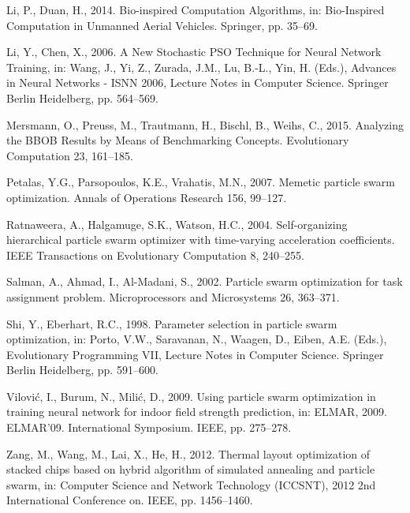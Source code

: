 \documentclass[12pt]{article}
\begin{document}
\begin{thebibliography}{20}
Li, P., Duan, H., 2014. Bio-inspired Computation Algorithms, in: Bio-Inspired Computation in Unmanned Aerial Vehicles. Springer, pp. 35–69.

Li, Y., Chen, X., 2006. A New Stochastic PSO Technique for Neural Network Training, in: Wang, J., Yi, Z., Zurada, J.M., Lu, B.-L., Yin, H. (Eds.), Advances in Neural Networks - ISNN 2006, Lecture Notes in Computer Science. Springer Berlin Heidelberg, pp. 564–569.

Mersmann, O., Preuss, M., Trautmann, H., Bischl, B., Weihs, C., 2015. Analyzing the BBOB Results by Means of Benchmarking Concepts. Evolutionary Computation 23, 161–185. %

Petalas, Y.G., Parsopoulos, K.E., Vrahatis, M.N., 2007. Memetic particle swarm optimization. Annals of Operations Research 156, 99–127. %

Ratnaweera, A., Halgamuge, S.K., Watson, H.C., 2004. Self-organizing hierarchical particle swarm optimizer with time-varying acceleration coefficients. IEEE Transactions on Evolutionary Computation 8, 240–255. %

Salman, A., Ahmad, I., Al-Madani, S., 2002. Particle swarm optimization for task assignment problem. Microprocessors and Microsystems 26, 363–371. %

Shi, Y., Eberhart, R.C., 1998. Parameter selection in particle swarm optimization, in: Porto, V.W., Saravanan, N., Waagen, D., Eiben, A.E. (Eds.), Evolutionary Programming VII, Lecture Notes in Computer Science. Springer Berlin Heidelberg, pp. 591–600.

Vilović, I., Burum, N., Milić, D., 2009. Using particle swarm optimization in training neural network for indoor field strength prediction, in: ELMAR, 2009. ELMAR’09. International Symposium. IEEE, pp. 275–278.

Zang, M., Wang, M., Lai, X., He, H., 2012. Thermal layout optimization of stacked chips based on hybrid algorithm of simulated annealing and particle swarm, in: Computer Science and Network Technology (ICCSNT), 2012 2nd International Conference on. IEEE, pp. 1456–1460.


\end{thebibliography}
\end{document}
